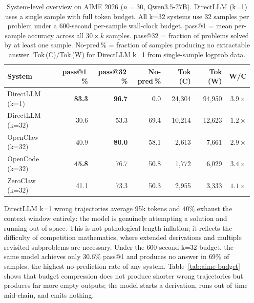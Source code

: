 \begin{table}[t]
\centering
\small
\caption{%
  System-level overview on AIME 2026 ($n=30$, Qwen3.5-27B).
  DirectLLM (k=1) uses a single sample with full token budget.
  All k=32 systems use 32 samples per problem under a 600-second per-sample
  wall-clock budget.
  pass@1 = mean per-sample accuracy across all $30{\times}k$ samples.
  pass@32 = fraction of problems solved by at least one sample.
  No-pred\,\% = fraction of samples producing no extractable answer.
  Tok\,(C)/Tok\,(W) for DirectLLM k=1 from single-sample logprob data.
}
\label{tab:aime-overview}
\setlength{\tabcolsep}{3.5pt}
\begin{tabular}{lrrrrrr}
\toprule
System & pass@1\,\% & pass@32\,\% & No-pred\,\% & Tok (C) & Tok (W) & W/C \\
\midrule
DirectLLM (k=1)  & \textbf{83.3} & \textbf{96.7} &  0.0 & 24{,}304 &  94{,}950 & $3.9{\times}$ \\
\midrule
DirectLLM (k=32) & 30.6 & 53.3 & 69.4 & 10{,}214 & 12{,}623 & $1.2{\times}$ \\
OpenClaw  (k=32) & 40.9 & \textbf{80.0} & 58.1 &  2{,}613 &  7{,}661 & $2.9{\times}$ \\
OpenCode  (k=32) & \textbf{45.8} & 76.7 & 50.8 &  1{,}772 &  6{,}029 & $3.4{\times}$ \\
ZeroClaw  (k=32) & 41.1 & 73.3 & 50.3 &  2{,}955 &  3{,}333 & $1.1{\times}$ \\
\bottomrule
\end{tabular}
\end{table}


DirectLLM k=1 wrong trajectories average 95k tokens and 40\% exhaust the
context window entirely: the model is genuinely attempting a solution and
running out of space.
This is not pathological length inflation; it reflects the difficulty of
competition mathematics, where extended derivations and multiple revisited
subproblems are necessary.
Under the 600-second k=32 budget, the same model achieves only 30.6\%
pass@1 and produces no answer in 69\% of samples, the highest no-prediction
rate of any system.
Table~\ref{tab:aime-budget} shows that budget compression does not produce
shorter wrong trajectories but produces far more empty outputs; the model
starts a derivation, runs out of time mid-chain, and emits nothing.


